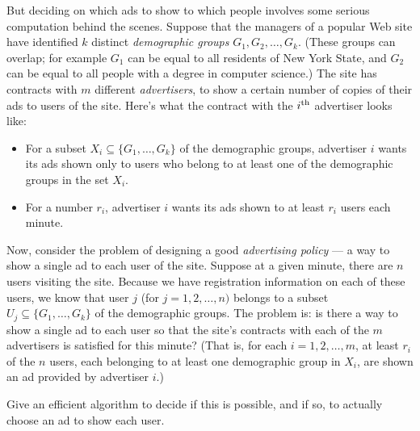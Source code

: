 \documentclass[12pt]{article}
\begin{document}
\begin{enumerate}
But deciding on which ads to show to which people
involves some serious computation behind the scenes.
Suppose that the managers of a popular Web site have
identified $k$ distinct {\em demographic groups}
$G_1, G_2, \ldots, G_k$.
(These groups can overlap; for example $G_1$ can be equal
to all residents of New York State, and $G_2$ can be equal to all
people with a degree in computer science.)
The site has contracts with $m$ different {\em advertisers},
to show a certain number of copies of their ads to users of the site.
Here's what the contract with the $i^{\rm th}$ advertiser looks like:
\begin{itemize}
\item For a subset $X_i \subseteq \{G_1, \ldots, G_k\}$ of the
demographic groups, advertiser $i$ wants its ads shown only
to users who belong to at least one of the demographic
groups in the set $X_i$.
\item For a number $r_i$, advertiser $i$ wants its ads
shown to at least $r_i$ users each minute.
\end{itemize}

Now, consider the problem of designing a good
{\em advertising policy} --- a way to show a single
ad to each user of the site.
Suppose at a given minute, there are $n$ users visiting the site.
Because we have registration information on each of these users,
we know that user $j$ (for $j = 1, 2, \ldots, n)$
belongs to a subset $U_j \subseteq \{G_1, \ldots, G_k\}$
of the demographic groups.
The problem is: is there a way to show a single ad
to each user so that the site's contracts
with each of the $m$ advertisers is satisfied for this minute?
(That is, for each $i = 1, 2, \ldots, m$, at least
$r_i$ of the $n$ users,
each belonging to at least one demographic group in $X_i$,
are shown an ad provided by advertiser $i$.)

Give an efficient algorithm to decide if this is possible,
and if so, to actually choose an ad to show each user.

\end{enumerate}
\end{document}
